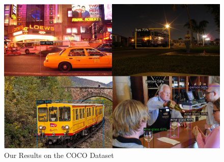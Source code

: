 \documentclass{article}
\begin{document}
\begin{figure}[h]
\begin{minipage}{0.47\textwidth}
  \includegraphics[width=\textwidth, height=0.17\textheight]{./../../figures/10shot.png}
  \end{minipage}
  \caption{Our Results on the COCO Dataset }
  \label{finetuning}
\end{figure}
\end{document}
